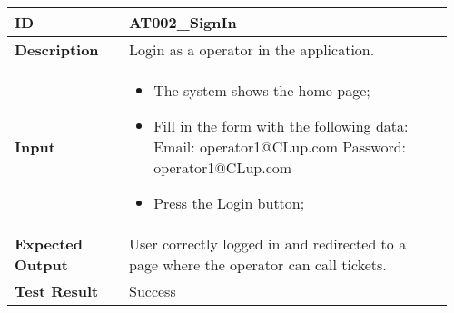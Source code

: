 \begin{table}[H]
	\centering
	\begin{tabular}{@{}p{0.25\linewidth}p{0.71\linewidth}@{}}
		\toprule
		\textbf{ID} & AT002\_SignIn \\
		\midrule
		\textbf{Description} & Login as a operator in the application. \\
		\midrule
		\textbf{Input} & \begin{itemize}[leftmargin=.4cm,noitemsep,topsep=0pt,before=\vspace{-3mm},after=\vspace{-4mm}]
			\item The system shows the home page;
			\item Fill in the form with the following data:\newline
			Email: operator1@CLup.com\newline
			Password: operator1@CLup.com
			\item Press the Login button;
		\end{itemize}\\
		\midrule
		\textbf{Expected Output} & User correctly logged in and redirected to a page where the operator can call tickets.\\
		\midrule
		\textbf{Test Result} & Success\\
		\bottomrule
	\end{tabular}
\end{table}

